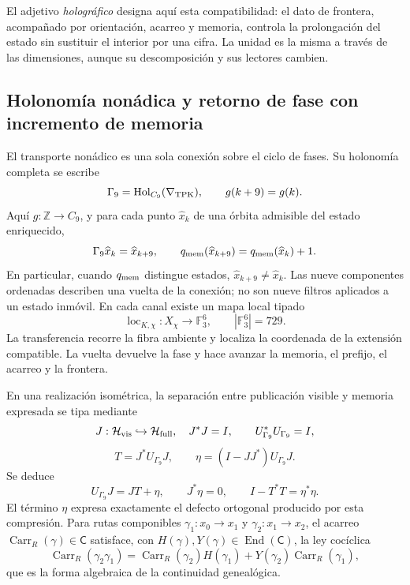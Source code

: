 El adjetivo \emph{holográfico} designa aquí esta compatibilidad: el dato de
frontera, acompañado por orientación, acarreo y memoria, controla la
prolongación del estado sin sustituir el interior por una cifra. La unidad es
la misma a través de las dimensiones, aunque su descomposición y sus lectores
cambien.

\subsection*{Holonomía nonádica y retorno de fase con incremento de memoria}

El transporte nonádico es una sola conexión sobre el ciclo de fases. Su
holonomía completa se escribe
\begin{equation}\label{p12-83-c0-s1:eq:horizonte-conexion-nonadica}
 \Gamma_9=\operatorname{Hol}_{C_9}(\nabla_{\rm TPK}),
 \qquad g(k+9)=g(k).
\end{equation}
Aquí \(g:\mathbb Z\to C_9\), y para cada punto
\(\widehat x_k\) de una órbita admisible del estado enriquecido,
\[
 \Gamma_9\widehat x_k=\widehat x_{k+9},\qquad
 q_{\rm mem}(\widehat x_{k+9})
 =q_{\rm mem}(\widehat x_k)+1.
\]
En particular, cuando \(q_{\rm mem}\) distingue estados,
\(\widehat x_{k+9}\neq\widehat x_k\).
Las nueve componentes ordenadas describen una vuelta de la conexión; no son
nueve filtros aplicados a un estado inmóvil. En cada canal existe un mapa
local tipado
\[
 \operatorname{loc}_{K,\chi}:X_\chi\longrightarrow\mathbb F_3^6,
 \qquad |\mathbb F_3^6|=729.
\]
La transferencia recorre la fibra ambiente y localiza la coordenada de la
extensión compatible. La vuelta devuelve la fase y hace avanzar la memoria,
el prefijo, el acarreo y la frontera.

En una realización isométrica, la separación entre publicación visible y
memoria expresada se tipa mediante
\[
 J:\mathcal H_{\rm vis}\hookrightarrow\mathcal H_{\rm full},
 \quad J^*J=I,\qquad
 U_{\Gamma_9}^*U_{\Gamma_9}=I,
\]
\[
 T=J^*U_{\Gamma_9}J,\qquad
 \eta=(I-JJ^*)U_{\Gamma_9}J.
\]
Se deduce
\begin{equation}\label{p12-83-c0-s1:eq:horizonte-compresion-expresion}
 U_{\Gamma_9}J=JT+\eta,
 \qquad J^*\eta=0,
 \qquad I-T^*T=\eta^*\eta.
\end{equation}
El término \(\eta\) expresa exactamente el defecto ortogonal producido por
esta compresión. Para rutas componibles
\(\gamma_1:x_0\to x_1\) y \(\gamma_2:x_1\to x_2\), el acarreo
\(\operatorname{Carr}_R(\gamma)\in\mathsf C\) satisface, con
\(H(\gamma),Y(\gamma)\in\operatorname{End}(\mathsf C)\), la ley cocíclica
\begin{equation}\label{p12-83-c0-s1:eq:horizonte-carry-cociclico}
 \operatorname{Carr}_R(\gamma_2\gamma_1)
 =\operatorname{Carr}_R(\gamma_2)H(\gamma_1)
  +Y(\gamma_2)\operatorname{Carr}_R(\gamma_1),
\end{equation}
que es la forma algebraica de la continuidad genealógica.

